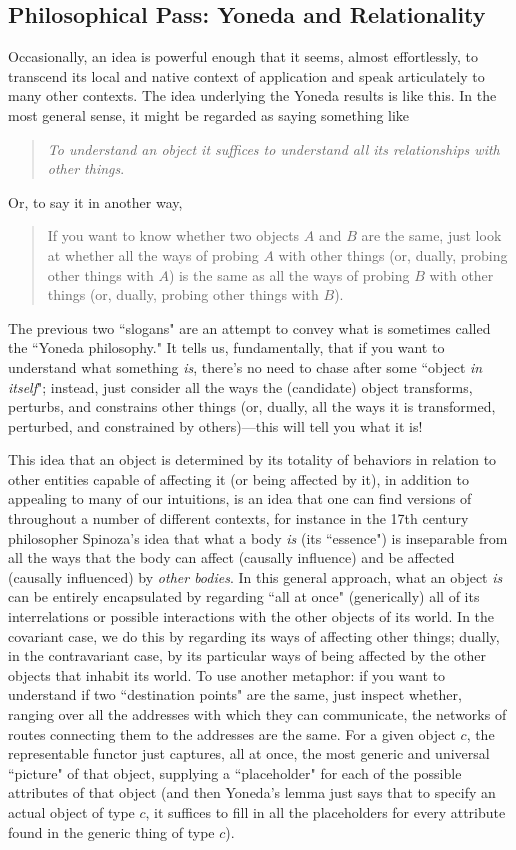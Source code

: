 \documentclass[a4paper]{book}
\theoremstyle{definition}
\theoremstyle{definition}
\theoremstyle{definition}
\theoremstyle{theorem}
\theoremstyle{definition}
\begin{document}
\subsection{Philosophical Pass: Yoneda and Relationality}
Occasionally, an idea is powerful enough that it seems, almost effortlessly, to transcend its local and native context of application and speak articulately to many other contexts. The idea underlying the Yoneda results is like this. In the most general sense, it might be regarded as saying something like  
\begin{quote} 
	\textit{To understand an object it suffices to understand all its relationships with other things}.
\end{quote} 
Or, to say it in another way,
\begin{quote}
	If you want to know whether two objects $A$ and $B$ are the same, just look at whether all the ways of probing $A$ with other things (or, dually, probing other things with $A$) is the same as all the ways of probing $B$ with other things (or, dually, probing other things with $B$).
\end{quote}
The previous two ``slogans" are an attempt to convey what is sometimes called the ``Yoneda philosophy."  It tells us, fundamentally, that if you want to understand what something \textit{is}, there's no need to chase after some ``object \textit{in itself}"; instead, just consider all the ways the (candidate) object transforms, perturbs, and constrains other things (or, dually, all the ways it is transformed, perturbed, and constrained by others)---this will tell you what it is! \par 
This idea that an object is determined by its totality of behaviors in relation to other entities capable of affecting it (or being affected by it), in addition to appealing to many of our intuitions, is an idea that one can find versions of throughout a number of different contexts, for instance in the 17th century philosopher Spinoza's idea that what a body \textit{is} (its ``essence") is inseparable from all the ways that the body can affect (causally influence) and be affected (causally influenced) by \textit{other bodies}. In this general approach, what an object \textit{is} can be entirely encapsulated by regarding ``all at once" (generically) all of its interrelations or possible interactions with the other objects of its world. In the covariant case, we do this by regarding its ways of affecting other things; dually, in the contravariant case, by its particular ways of being affected by the other objects that inhabit its world. To use another metaphor: if you want to understand if two ``destination points" are the same, just inspect whether, ranging over all the addresses with which they can communicate, the networks of routes connecting them to the addresses are the same. For a given object $c$, the representable functor just captures, all at once, the most generic and universal ``picture" of that object, supplying a ``placeholder" for each of the possible attributes of that object (and then Yoneda's lemma just says that to specify an actual object of type $c$, it suffices to fill in all the placeholders for every attribute found in the generic thing of type $c$).\par
\end{document}
